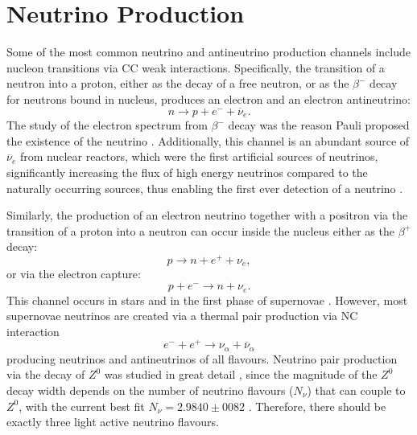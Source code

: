 \section{Neutrino Production}\label{sec:NeutrinoProduction}
Some of the most common neutrino and antineutrino production channels include nucleon transitions via \gls{CC} weak interactions. Specifically, the transition of a neutron into a proton, either as the decay of a free neutron, or as the $\beta^-$ decay for neutrons bound in nucleus, produces an electron and an electron antineutrino:
\begin{equation}
n\rightarrow p+e^-+\overline{\nu}_e.
\end{equation}
The study of the electron spectrum from $\beta^-$ decay was the reason Pauli proposed the existence of the neutrino \cite{PauliNeutrinoProposalLetter.pdf}. Additionally, this channel is an abundant source of $\overline{\nu}_e$ from nuclear reactors, which were the first artificial sources of neutrinos, significantly increasing the flux of high energy neutrinos compared to the naturally occurring sources, thus enabling the first ever detection of a neutrino \cite{CowanReinesFirstAttempt.pdf, CowanReinesConfirmation.pdf, NeutrinoPhysicsCowanReines.pdf}.

Similarly, the production of an electron neutrino together with a positron via the transition of a proton into a neutron can occur inside the nucleus either as the $\beta^+$ decay:
\begin{equation}
p\rightarrow n+e^++\nu_e,
\end{equation}
or via the electron capture:
\begin{equation}
p+e^-\rightarrow n+\nu_e.
\end{equation}
This channel occurs in stars and in the first phase of supernovae \cite{FundamentalsOfNeutrinoPhysics.pdf}. However, most supernovae neutrinos are created via a thermal pair production via \gls{NC} interaction
\begin{equation}
e^-+e^+\rightarrow\nu_\alpha+\overline{\nu}_\alpha
\end{equation}
producing neutrinos and antineutrinos of all flavours. Neutrino pair production via the decay of $Z^0$ was studied in great detail \cite{ZDecay.pdf}, since the magnitude of the $Z^0$ decay width depends on the number of neutrino flavours ($N_\nu$) that can couple to $Z^0$, with the current best fit $N_\nu=2.9840\pm 0082$ \cite{ZDecayPrecise.pdf}. Therefore, there should be exactly three light active neutrino flavours.

